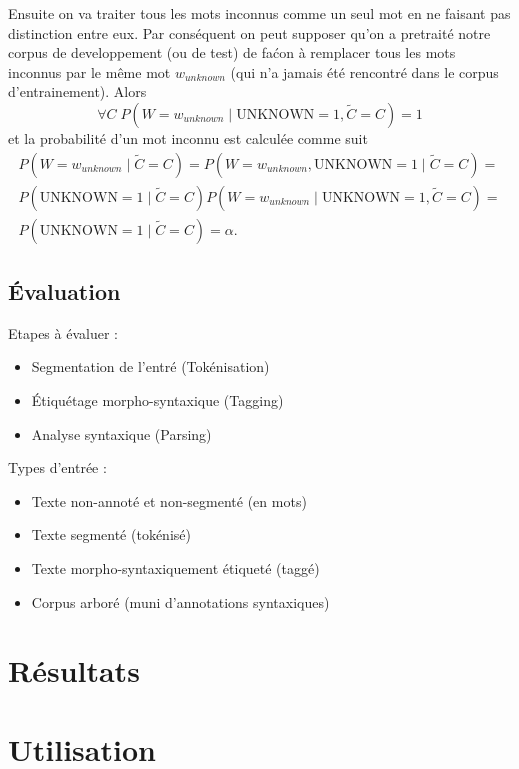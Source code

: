 \documentclass[12pt]{article}
\begin{document}
Ensuite on va traiter tous les mots inconnus comme un seul mot en ne faisant pas distinction entre eux. 
Par cons\'equent on peut supposer qu'on a pretrait\'e notre corpus de developpement (ou de test) de fa\'con \`a remplacer tous les mots inconnus par le m\^eme mot $w_{unknown}$ (qui n'a jamais \'et\'e rencontr\'e dans le corpus d'entrainement). Alors 
$$\forall C \; P(W = w_{unknown} \mid \mathrm{UNKNOWN} = 1, \tilde{C} = C) = 1$$
et la probabilit\'e d'un mot inconnu est calcul\'ee comme suit
\begin{multline}
\label{prob_mot_inconnu_1}
 P(W = w_{unknown} \mid \tilde{C} = C) = P(W = w_{unknown}, \mathrm{UNKNOWN} = 1 \mid \tilde{C} = C) =
 \\
 P(\mathrm{UNKNOWN} = 1 \mid \tilde{C} = C) P(W = w_{unknown} \mid \mathrm{UNKNOWN} = 1, \tilde{C} = C) =
 \\
 P(\mathrm{UNKNOWN} = 1 \mid \tilde{C} = C) = \alpha.
\end{multline}


\subsection{\'Evaluation}

Etapes \`a \'evaluer :
\begin{itemize}
\item Segmentation de l'entr\'e (Tok\'enisation)
\item \'Etiqu\'etage morpho-syntaxique (Tagging)
\item Analyse syntaxique (Parsing)
\end{itemize}

Types d'entr\'ee :
\begin{itemize}
\item Texte non-annot\'e et non-segment\'e (en mots)
\item Texte segment\'e (tok\'enis\'e)
\item Texte morpho-syntaxiquement \'etiquet\'e (tagg\'e)
\item Corpus arbor\'e (muni d'annotations syntaxiques)
\end{itemize}


\section{R\'esultats}

\section{Utilisation}
\end{document}
